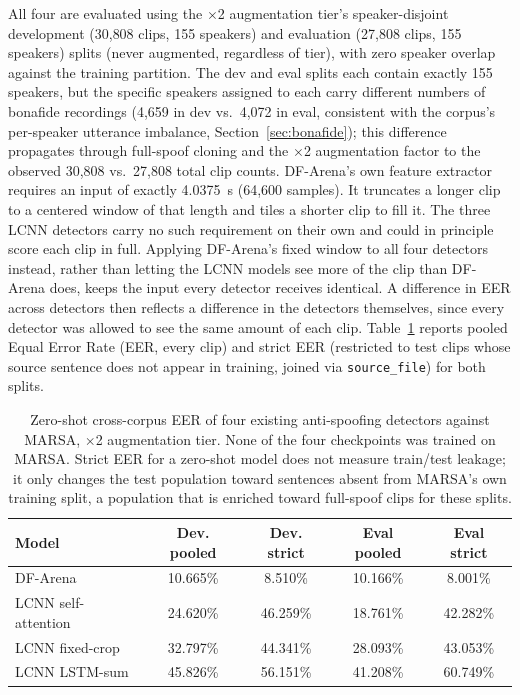 \documentclass[11pt]{report}
\begin{document}
All four are evaluated using the $\times$2 augmentation tier's
speaker-disjoint development (30{,}808 clips, 155 speakers) and
evaluation (27{,}808 clips, 155 speakers) splits (never augmented,
regardless of tier), with zero speaker overlap against the training
partition. The dev and eval splits each contain exactly 155 speakers,
but the specific speakers assigned to each carry different numbers of
bonafide recordings (4{,}659 in dev vs.\ 4{,}072 in eval, consistent
with the corpus's per-speaker utterance imbalance,
Section~\ref{sec:bonafide}); this difference propagates through
full-spoof cloning and the $\times$2 augmentation factor to the
observed 30{,}808 vs.\ 27{,}808 total clip counts. DF-Arena's own feature
extractor requires an input of exactly \SI{4.0375}{\second} (64{,}600
samples). It truncates a longer clip to a centered window of that
length and tiles a shorter clip to fill it. The three LCNN detectors
carry no such requirement on their own and could in principle score
each clip in full. Applying DF-Arena's fixed window to all four
detectors instead, rather than letting the LCNN models see more of the
clip than DF-Arena does, keeps the input every detector receives
identical. A difference in EER across detectors then reflects a
difference in the detectors themselves, since every detector was
allowed to see the same amount of each clip. Table~\ref{tab:baseline} reports pooled Equal
Error Rate (EER, every clip) and strict EER (restricted to test clips
whose source sentence does not appear in training, joined via
\texttt{source\_file}) for both splits.

\begin{table}[H]
\centering
\caption{Zero-shot cross-corpus EER of four existing anti-spoofing detectors against
MARSA, $\times$2 augmentation tier. None of the four checkpoints was
trained on MARSA. Strict EER for a zero-shot model does not measure
train/test leakage; it only changes the test population toward
sentences absent from MARSA's own training split, a population that is
enriched toward full-spoof clips for these splits.}
\label{tab:baseline}
\small
\begin{tabular}{lcccc}
\toprule
\textbf{Model} & \textbf{Dev. pooled} & \textbf{Dev. strict} & \textbf{Eval pooled} & \textbf{Eval strict} \\
\midrule
DF-Arena \citep{dowerah2025speechdfarena} & 10.665\% & 8.510\% & 10.166\% & 8.001\% \\
LCNN self-attention \citep{wang2021comparative} & 24.620\% & 46.259\% & 18.761\% & 42.282\% \\
LCNN fixed-crop \citep{wang2021comparative} & 32.797\% & 44.341\% & 28.093\% & 43.053\% \\
LCNN LSTM-sum \citep{wang2021comparative} & 45.826\% & 56.151\% & 41.208\% & 60.749\% \\
\bottomrule
\end{tabular}
\end{table}
\end{document}
